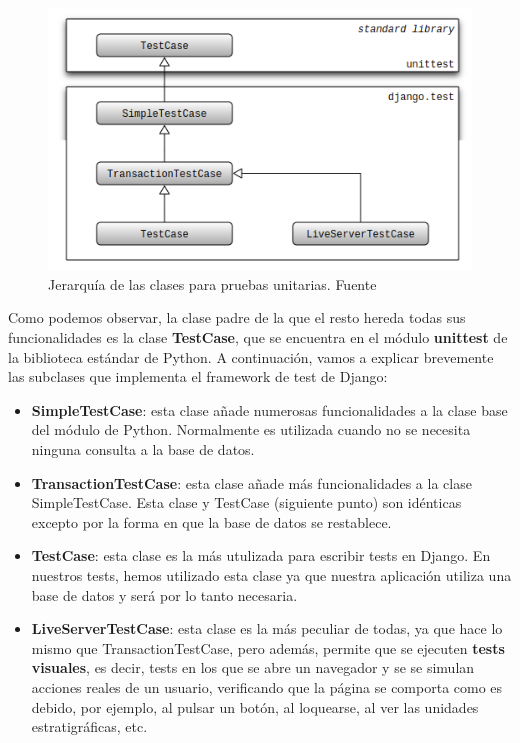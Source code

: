     \begin{figure}[H]
        \centering
        \includegraphics[scale=0.60]{imagenes/classes-hierarchy.png}
        \caption[Jerarquía de las clases para pruebas unitarias.]{Jerarquía de las
        clases para pruebas unitarias. Fuente \cite{classes-hierarchy}}
        \label{fig:classes-hierarchy}
    \end{figure}

Como podemos observar, la clase padre de la que el resto hereda todas sus funcionalidades
es la clase \textbf{TestCase}, que se encuentra en el módulo \textbf{unittest} de la
biblioteca estándar de Python. A continuación, vamos a explicar brevemente las subclases
que implementa el framework de test de Django:

    \begin{itemize}
        \item \textbf{SimpleTestCase}: esta clase añade numerosas funcionalidades a la
        clase base del módulo de Python. Normalmente es utilizada cuando no se necesita
        ninguna consulta a la base de datos.
        \item \textbf{TransactionTestCase}: esta clase añade más funcionalidades a la
        clase SimpleTestCase. Esta clase y TestCase (siguiente punto) son idénticas
        excepto por la forma en que la base de datos se restablece.
        \item \textbf{TestCase}: esta clase es la más utulizada para escribir tests en
        Django. En nuestros tests, hemos utilizado esta clase ya que nuestra aplicación
        utiliza una base de datos y será por lo tanto necesaria.
        \item \textbf{LiveServerTestCase}: esta clase es la más peculiar de todas, ya que
        hace lo mismo que TransactionTestCase, pero además, permite que se ejecuten
        \textbf{tests visuales}, es decir, tests en los que se abre un navegador y se
        se simulan acciones reales de un usuario, verificando que la página se comporta
        como es debido, por ejemplo, al pulsar un botón, al loquearse, al ver las unidades
        estratigráficas, etc.
    \end{itemize}

